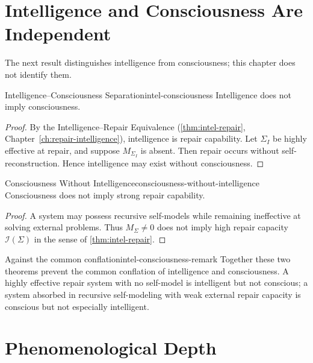 \documentclass[12pt,twoside,openright]{book}
\begin{document}
\section{Intelligence and Consciousness Are Independent}
\label{sec:ch21-separation}

The next result distinguishes intelligence from
consciousness; this chapter does not identify them.

\begin{theorem}{Intelligence--Consciousness Separation}{intel-consciousness}
  Intelligence does not imply consciousness.
\end{theorem}

\begin{proof}
  By the Intelligence--Repair Equivalence
  (\cref{thm:intel-repair}, Chapter~\ref{ch:repair-intelligence}),
  intelligence is repair capability. Let $\Sigma_I$ be
  highly effective at repair, and suppose $M_{\Sigma_I}$ is
  absent. Then repair occurs without self-reconstruction.
  Hence intelligence may exist without consciousness.
\end{proof}

\begin{theorem}{Consciousness Without Intelligence}{consciousness-without-intelligence}
  Consciousness does not imply strong repair capability.
\end{theorem}

\begin{proof}
  A system may possess recursive self-models while remaining
  ineffective at solving external problems. Thus
  $M_\Sigma \ne 0$ does not imply high repair capacity
  $\mathcal{I}(\Sigma)$ in the sense of
  \cref{thm:intel-repair}.
\end{proof}

\begin{remark}{Against the common conflation}{intel-consciousness-remark}
  Together these two theorems prevent the common conflation
  of intelligence and consciousness. A highly effective
  repair system with no self-model is intelligent but not
  conscious; a system absorbed in recursive self-modeling
  with weak external repair capacity is conscious but not
  especially intelligent.
\end{remark}

\section{Phenomenological Depth}
\label{sec:ch21-depth}
\end{document}
